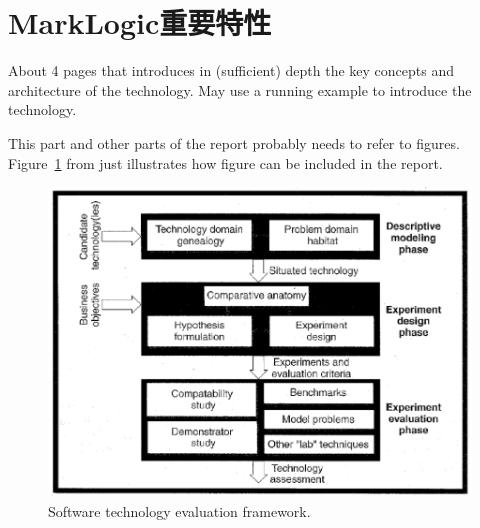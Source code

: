 \section{MarkLogic重要特性}
\label{sec:background}

About 4 pages that introduces in (sufficient) depth the key concepts
and architecture of the technology.  May use a running example to
introduce the technology.

This part and other parts of the report probably needs to refer to
figures. Figure~\ref{fig:framework} from \cite{brown:96} just
illustrates how figure can be included in the report.

\begin{figure}
  \centering
  \includegraphics[scale=0.5]{figs/framework.png}
  \caption{Software technology evaluation framework.}
  \label{fig:framework}
\end{figure}
